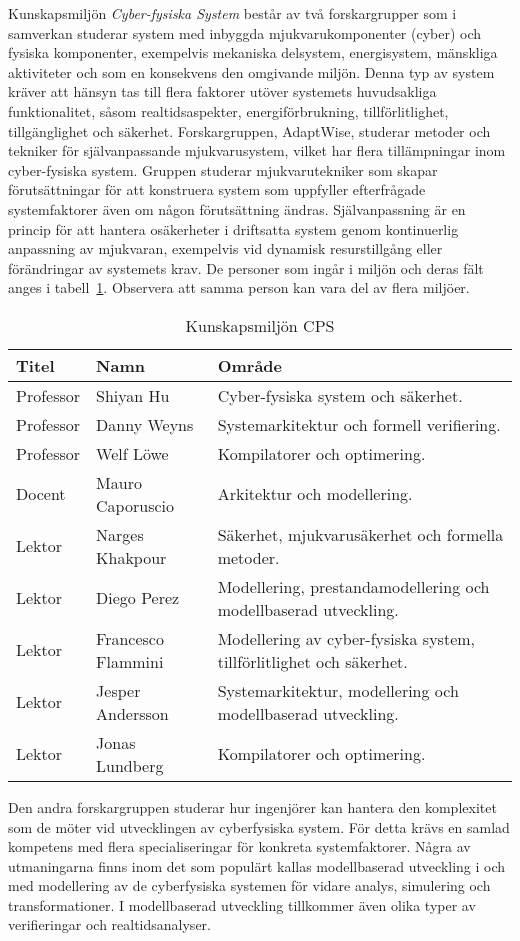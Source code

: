 Kunskapsmiljön \emph{Cyber-fysiska System} består av två forskargrupper som i samverkan studerar system med inbyggda mjukvarukomponenter (cyber) och fysiska komponenter, exempelvis mekaniska delsystem, energisystem, mänskliga aktiviteter och som en konsekvens den omgivande miljön. Denna typ av system kräver att hänsyn tas till flera faktorer utöver systemets huvudsakliga funktionalitet, såsom realtidsaspekter, energiförbrukning, tillförlitlighet, tillgänglighet och säkerhet. Forskargruppen, AdaptWise, studerar metoder och tekniker för självanpassande mjukvarusystem, vilket har flera tillämpningar inom cyber-fysiska system. Gruppen studerar mjukvarutekniker som skapar förutsättningar för att konstruera system som uppfyller efterfrågade systemfaktorer även om någon förutsättning ändras. Självanpassning är en princip för att hantera osäkerheter i driftsatta system genom kontinuerlig anpassning av mjukvaran, exempelvis vid dynamisk resurstillgång eller förändringar av systemets krav. De personer som ingår i miljön och deras fält anges i tabell~\ref{tab:kmcpsaw}. Observera att samma person kan vara del av flera miljöer.

\begin{table}
\centering
\caption{Kunskapsmiljön CPS\label{tab:kmcpsaw}}
\begin{tabular}{@{}llp{8cm}@{}}
\toprule
\textbf{\textsf{Titel}} & \textbf{\textsf{Namn}} & \textbf{\textsf{Område}}\tabularnewline
\midrule
Professor & Shiyan Hu & Cyber-fysiska system och säkerhet.\tabularnewline
Professor & Danny Weyns & Systemarkitektur och formell
verifiering.\tabularnewline
Professor & Welf Löwe & Kompilatorer och optimering.\tabularnewline
Docent & Mauro Caporuscio & Arkitektur och modellering.\tabularnewline
Lektor & Narges Khakpour & Säkerhet, mjukvarusäkerhet och formella
metoder.\tabularnewline
Lektor & Diego Perez & Modellering, prestandamodellering och modellbaserad
utveckling.\tabularnewline
Lektor & Francesco Flammini & Modellering av cyber-fysiska system,
tillförlitlighet och säkerhet.\tabularnewline
Lektor & Jesper Andersson & Systemarkitektur, modellering och modellbaserad
utveckling.\tabularnewline
Lektor & Jonas Lundberg & Kompilatorer och optimering.\tabularnewline
\bottomrule
\end{tabular}
\end{table}

Den andra forskargruppen studerar hur ingenjörer kan hantera den komplexitet som de möter vid utvecklingen av cyberfysiska system. För detta krävs en samlad kompetens med flera specialiseringar för konkreta systemfaktorer. Några av utmaningarna finns inom det som populärt kallas modellbaserad utveckling i och med modellering av de cyberfysiska systemen för vidare analys, simulering och transformationer. I modellbaserad utveckling tillkommer även olika typer av verifieringar och realtidsanalyser.

